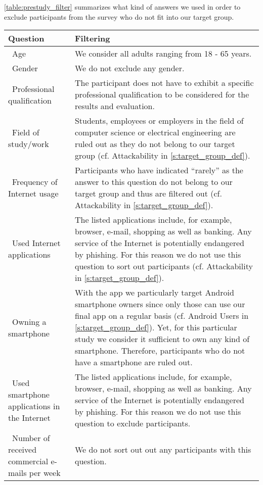 \autoref{table:prestudy_filter} summarizes what kind of answers we used in order to exclude participants from the survey who do not fit into our target group.
\begin{table}[hHtbp]
\centering
    \begin{tabular}{ | p{4.5cm} | p{10cm} |}
    \hline\textbf{Question} & \textbf{Filtering}  \\  \hline
		\hline\  Age & We consider all adults ranging from 18 - 65 years.
 \\
    \hline\  Gender & We do not exclude any gender.
 \\ 
    \hline\  Professional qualification & The participant does not have to exhibit a specific professional qualification to be considered for the results and evaluation.
 \\ 
		\hline\  Field of study/work & Students, employees or employers in the field of computer science or electrical engineering are ruled out as they do not belong to our target group (cf. Attackability in \autoref{s:target_group_def}).
 \\ 
	  \hline\ Frequency of Internet usage & Participants who have indicated ``rarely'' as the answer to this question do not belong to our target group and thus are filtered out (cf. Attackability in \autoref{s:target_group_def}).
 \\ 
	  \hline\ Used Internet applications  &  The listed applications include, for example, browser, e-mail, shopping as well as banking.
 Any service of the Internet is potentially endangered by phishing.
 For this reason we do not use this question to sort out participants (cf. Attackability in \autoref{s:target_group_def}).
\\ 
    \hline\ Owning a smartphone  & With the app we particularly target Android smartphone owners since only those can use our final app on a regular basis (cf. Android Users in \autoref{s:target_group_def}).
 Yet, for this particular study we consider it sufficient to own any kind of smartphone.
Therefore, participants who do not have a smartphone are ruled out.
 \\
		\hline\ Used smartphone applications in the Internet  & The listed applications include, for example, browser, e-mail, shopping as well as banking.
 Any service of the Internet is potentially endangered by phishing.
 For this reason we do not use this question to exclude participants.
 \\
    \hline\ Number of received commercial e-mails per week  & We do not sort out out any participants with this question.

\end{tabular}
\end{table}

